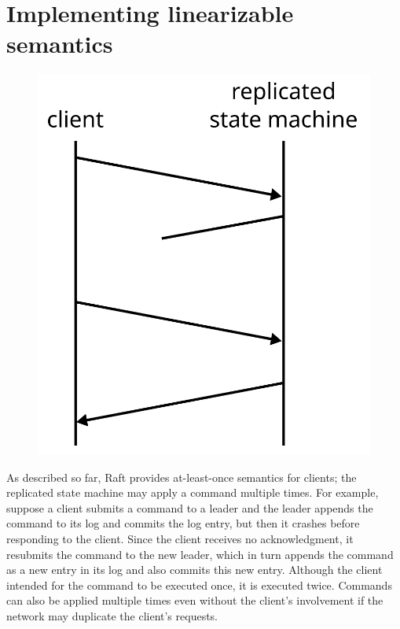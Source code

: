 \section{Implementing linearizable semantics}
\label{clients:linearizability}


\begin{figure}
\centering
\includegraphics[scale=0.45]{clients/retrydup}
\label{fig:clients:retrydup}
\end{figure}

As described so far, Raft provides at-least-once semantics for clients;
the replicated state machine may apply a command multiple times. For
example, suppose a client submits a command to a leader and the leader
appends the command to its log and commits the log entry, but then it
crashes before responding to the client. Since the client receives no
acknowledgment, it resubmits the command to the new leader, which in
turn appends the command as a new entry in its log and also commits this
new entry. Although the client intended for the command to be executed
once, it is executed twice. Commands can also be applied multiple times
even without the client's involvement if the network may duplicate the
client's requests.

